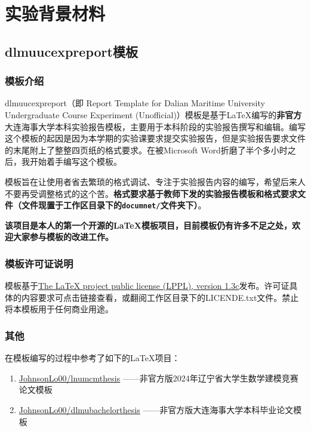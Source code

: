 \section{实验背景材料}

\subsection{dlmuucexpreport模板}

\subsubsection{模板介绍}

dlmuucexpreport（即 Report Template for Dalian Maritime University Undergraduate Course Experiment (Unofficial)）模板是基于\LaTeX 编写的\textbf{非官方}大连海事大学本科实验报告模板，主要用于本科阶段的实验报告撰写和编辑。编写这个模板的起因是因为本学期的实验课要求提交实验报告，但是实验报告要求文件的末尾附上了整整四页纸的格式要求。在被Microsoft Word折磨了半个多小时之后，我开始着手编写这个模板。

模板旨在让使用者省去繁琐的格式调试、专注于实验报告内容的编写，希望后来人不要再受调整格式的这个苦。\textbf{格式要求基于教师下发的实验报告模板和格式要求文件（文件现置于工作区目录下的\texttt{documnet/}文件夹下）}。

\textbf{该项目是本人的第一个开源的\LaTeX 模板项目，目前模板仍有许多不足之处，欢迎大家参与模板的改进工作。}

\subsubsection{模板许可证说明}

模板基于\href{https://www.latex-project.org/lppl/lppl-1-3c/}{The LaTeX project public license (LPPL), version 1.3c}发布。许可证具体的内容要求可点击链接查看，或翻阅工作区目录下的LICENDE.txt文件。禁止将本模板用于任何商业用途。

\subsubsection{其他}

在模板编写的过程中参考了如下的\LaTeX 项目：

\begin{enumerate}
  \item \href{https://github.com/JohnsonLo00/lnumcmthesis}{JohnsonLo00/lnumcmthesis} ——非官方版2024年辽宁省大学生数学建模竞赛论文模板
  \item \href{https://github.com/JohnsonLo00/dlmubachelorthesis}{JohnsonLo00/dlmubachelorthesis} ——非官方版大连海事大学本科毕业论文模板
\end{enumerate}

